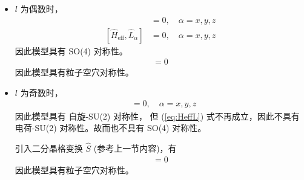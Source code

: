 \begin{itemize}

\item $l$ 为偶数时，
\begin{align}
[\hat{H}_{\text{eff}}, \hat{S}_{\alpha}] &= 0, \quad \alpha=x,y,z \\
[\hat{H}_{\text{eff}}, \hat{L}_{\alpha}] &= 0, \quad \alpha=x,y,z 
\label{eq:HeffL}
\end{align}
因此模型具有 SO(4) 对称性。
\begin{align}
[\hat{H}_{\text{eff}}, \hat{C}]=0
\end{align}
因此模型具有粒子空穴对称性。

\item $l$ 为奇数时，
\begin{align}
[\hat{H}_{\text{eff}}, \hat{S}_{\alpha}] &= 0, \quad \alpha=x,y,z
\end{align}
因此模型具有 自旋-SU(2) 对称性，
但 (\ref{eq:HeffL}) 式不再成立，因此不具有 电荷-SU(2) 对称性。故而也不具有 SO(4) 对称性。

引入二分晶格变换 $\hat{S}$ (参考上一节内容)，有
\begin{align}
[\hat{H}_{\text{eff}}, \hat{C}\hat{S}]=0
\end{align}
因此模型具有粒子空穴对称性。

\end{itemize}



